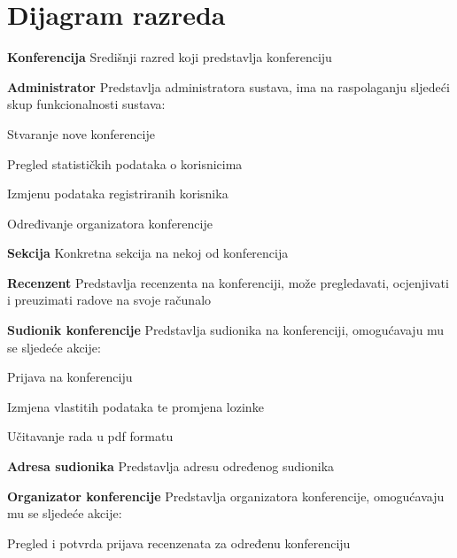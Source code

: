 			\eject
			
			
			
			
			
		\section{Dijagram razreda}
		
			\noindent {}
			\begin{packed_item}
				\item \textbf{Konferencija} Središnji razred koji predstavlja konferenciju
				\item \textbf{Administrator} Predstavlja administratora sustava, ima na raspolaganju sljedeći skup funkcionalnosti sustava:
				\begin{packed_item}
					\item Stvaranje nove konferencije
					\item Pregled statističkih podataka o korisnicima
					\item Izmjenu podataka registriranih korisnika
					\item Određivanje organizatora konferencije
				\end{packed_item}
				\item \textbf{Sekcija}  Konkretna sekcija na nekoj od konferencija
				\item \textbf{Recenzent} Predstavlja recenzenta na konferenciji, može pregledavati, \linebreak ocjenjivati i preuzimati radove na svoje računalo
				\item \textbf{Sudionik konferencije} Predstavlja sudionika na konferenciji,  omogućavaju \linebreak mu se sljedeće akcije:
				\begin{packed_item}
					\item Prijava na konferenciju
					\item Izmjena vlastitih podataka te promjena lozinke
					\item Učitavanje rada u pdf formatu
				\end{packed_item}
				\item \textbf{Adresa sudionika} Predstavlja adresu određenog sudionika
				\item \textbf{Organizator konferencije} Predstavlja organizatora konferencije,  omogućavaju \linebreak mu se sljedeće akcije:
				\begin{packed_item}
					\item Pregled i potvrda prijava recenzenata za određenu konferenciju

\end{packed_item}
\end{packed_item}
